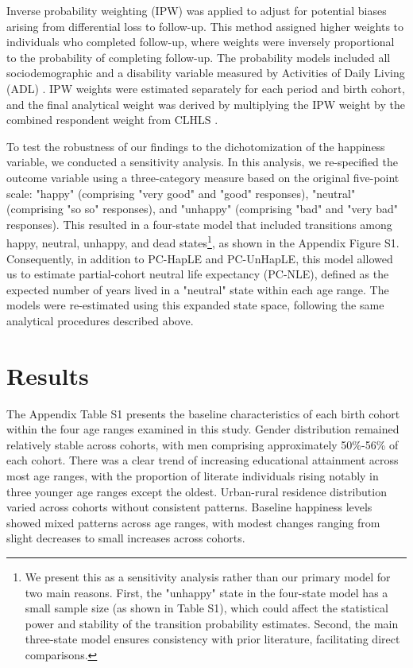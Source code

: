 \documentclass[12pt, a4paper]{article}
\begin{document}
Inverse probability weighting (IPW) was applied to adjust for potential biases arising from differential loss to follow-up. This method assigned higher weights to individuals who completed follow-up, where weights were inversely proportional to the probability of completing follow-up. The probability models included all sociodemographic and a disability variable measured by Activities of Daily Living (ADL) \autocite{payne.2022.expansion,liu.2019.are,shen.2023.disability}. IPW weights were estimated separately for each period and birth cohort, and the final analytical weight was derived by multiplying the IPW weight by the combined respondent weight from CLHLS \autocite{dugoff.2014.generalizing,liu.2019.are}.

To test the robustness of our findings to the dichotomization of the happiness variable, we conducted a sensitivity analysis. In this analysis, we re-specified the outcome variable using a three-category measure based on the original five-point scale: "happy" (comprising "very good" and "good" responses), "neutral" (comprising "so so" responses), and "unhappy" (comprising "bad" and "very bad" responses). This resulted in a four-state model that included transitions among happy, neutral, unhappy, and dead states\footnote{We present this as a sensitivity analysis rather than our primary model for two main reasons. First, the "unhappy" state in the four-state model has a small sample size (as shown in Table S1), which could affect the statistical power and stability of the transition probability estimates. Second, the main three-state model ensures consistency with prior literature, facilitating direct comparisons.}, as shown in the Appendix Figure S1. Consequently, in addition to PC-HapLE and PC-UnHapLE, this model allowed us to estimate partial-cohort neutral life expectancy (PC-NLE), defined as the expected number of years lived in a "neutral" state within each age range. The models were re-estimated using this expanded state space, following the same analytical procedures described above.

\section{Results}
The Appendix Table S1 presents the baseline characteristics of each birth cohort within the four age ranges examined in this study. Gender distribution remained relatively stable across cohorts, with men comprising approximately 50\%-56\% of each cohort. There was a clear trend of increasing educational attainment across most age ranges, with the proportion of literate individuals rising notably in three younger age ranges except the oldest. Urban-rural residence distribution varied across cohorts without consistent patterns. Baseline happiness levels showed mixed patterns across age ranges, with modest changes ranging from slight decreases to small increases across cohorts.
\end{document}

